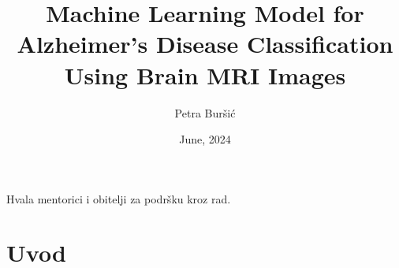 \documentclass[zavrsnirad,upload]{fer}
\title{Machine Learning Model for Alzheimer's Disease Classification Using Brain MRI Images}
\author{Petra Buršić}
\date{June, 2024}
\begin{document}
\maketitle






\begin{zahvale}
  Hvala mentorici i obitelji za podršku kroz rad.
\end{zahvale}


\tableofcontents


\mainmatter


\chapter{Uvod}
\label{pog:uvod}
\end{document}
